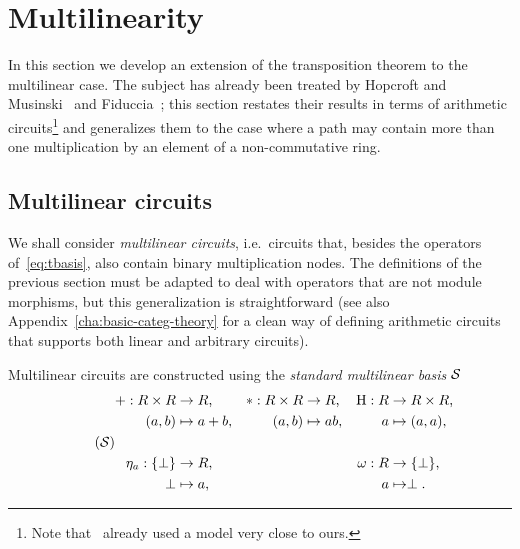 

\section{Multilinearity}
\label{sec:multi}

 In this section we develop an extension of the
transposition theorem to the multilinear case.  The subject has
already been treated by Hopcroft and
Musinski~\cite{hopcroft+musinski73} and Fiduccia~\cite{fiduccia:phd};
this section restates their results in terms of arithmetic
circuits\footnote{Note that~\cite{fiduccia:phd} already used a model
  very close to ours.} and generalizes them to the case where a path
may contain more than one multiplication by an element of a
non-commutative ring.

\subsection{Multilinear circuits}
\label{sec:multilinear-circuits}
We shall consider \emph{multilinear
  circuits}, i.e.\ circuits that, besides the operators
of~\ref{eq:tbasis}, also contain binary multiplication nodes. The
definitions of the previous section must be adapted to deal with
operators that are not module morphisms, but this generalization is
straightforward (see also Appendix~\ref{cha:basic-categ-theory} for a
clean way of defining arithmetic circuits that supports both linear
and arbitrary circuits).

  Multilinear circuits are constructed using
the \emph{standard multilinear
  basis} $\mathcal{S}$
\begin{equation}
  \label{eq:sbasis}
  \tag{$\Sbasis$}
  \begin{aligned}
    + : R\times R &\ra R\text{,}    & * : R\times R &\ra R\text{,} &  \hub : R &\ra R\times R\text{,}\\
      (a, b) &\mapsto a+b\text{,}   &   (a, b) &\mapsto ab\text{,} &         a &\mapsto (a,a)\text{,}\\ \\
    \eta_a : \{\bom\} &\ra R\text{,}     &&& \omega : R &\ra \{\bom\}\text{,} \\
          \bom &\mapsto a\text{,} &&&          a &\mapsto \bom\text{.}
  \end{aligned}
\end{equation}


